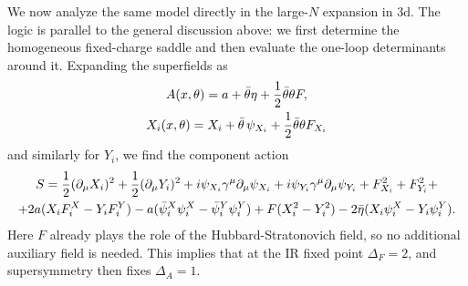 \documentclass[a4paper,11pt]{article}
\begin{document}
We now analyze the same model directly in the large-$N$ expansion in 3d. The logic is parallel to the general discussion above: we first determine the homogeneous fixed-charge saddle and then evaluate the one-loop determinants around it. Expanding the superfields as
\begin{gather}
A(x,\theta) = a + \bar{\theta} \eta + \frac12 \bar{\theta}\theta F, \notag\\
X_i(x,\theta) = X_i + \bar{\theta} \, \psi_{X_i} + \frac12 \bar{\theta}\theta F_{X_i}
\end{gather}
and similarly for $Y_i$, we find the component action
\begin{gather}
    S = \frac12(\partial_\mu X_i)^2 + \frac12 (\partial_\mu Y_i)^2 + i \psi_{X_i}\gamma^\mu \partial_\mu \psi_{X_i} + i \psi_{Y_i}\gamma^\mu \partial_\mu \psi_{Y_i} + F_{X_i}^2 + F_{Y_i}^2 + \notag\\
    +2 a (X_i F^X_i - Y_i F^Y_i) - a (\bar{\psi}^X_i \psi^X_i - \bar{\psi}^Y_i \psi^Y_i) + F(X_i^2 - Y_i^2) - 2 \bar{\eta}(X_i \psi^X_i - Y_i \psi^Y_i).
\end{gather}
Here $F$ already plays the role of the Hubbard-Stratonovich field, so no additional auxiliary field is needed. This implies that at the IR fixed point $\Delta_F=2$, and supersymmetry then fixes $\Delta_A=1$.
\end{document}
